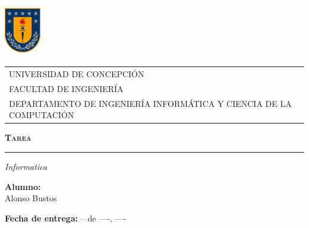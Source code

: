 \begin{titlepage}
\includegraphics[width=1.6cm]{img/logo-udec1.pdf}
\vspace*{-2.2cm} %


\begin{tabular}{l}
\hspace{2cm} UNIVERSIDAD DE CONCEPCIÓN\\
\hspace{2cm} FACULTAD DE INGENIERÍA\\
\hspace{2cm} DEPARTAMENTO DE INGENIERÍA INFORMÁTICA Y CIENCIA DE LA COMPUTACIÓN\\
\end{tabular}

\begin{center}
\vspace{3cm}
{\scshape\Huge \textbf{Tarea } \par}
\rule{80mm}{0.1mm}

{\itshape\LARGE Informatica \par}
\vfill
\vspace{0.5cm}
{\large \textbf{Alumno:}\\\normalsize Alonso Bustos \par} 


\medskip
\textbf{Fecha de entrega:} -- de ----, ----
\vspace{3cm}
\end{center}
\end{titlepage}
\newpage